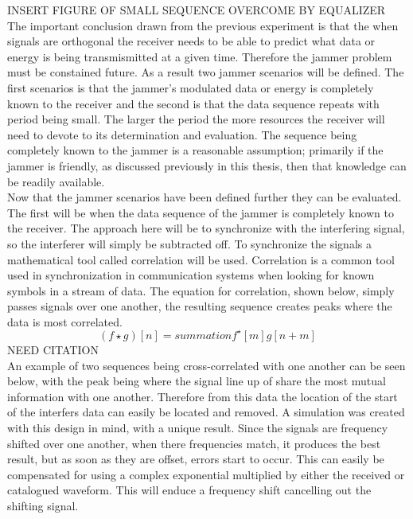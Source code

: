 INSERT FIGURE OF SMALL SEQUENCE OVERCOME BY EQUALIZER\\

The important conclusion drawn from the previous experiment is that the when signals are orthogonal the receiver needs to be able to predict what data or energy is being transmismitted at a given time.  Therefore the jammer problem must be constained future.  As a result two jammer scenarios will be defined.  The first scenarios is that the jammer's modulated data or energy is completely known to the receiver and the second is that the data sequence repeats with period being small.  The larger the period the more resources the receiver will need to devote to its determination and evaluation.  The sequence being completely known to the jammer is a reasonable assumption; primarily if the jammer is friendly, as discussed previously in this thesis, then that knowledge can be readily available.\\

Now that the jammer scenarios have been defined further they can be evaluated.  The first will be when the data sequence of the jammer is completely known to the receiver.  The approach here will be to synchronize with the interfering signal, so the interferer will simply be subtracted off.  To synchronize the signals a mathematical tool called correlation will be used.  Correlation is a common tool used in synchronization in communication systems when looking for known symbols in a stream of data.  The equation for correlation, shown below, simply passes signals over one another, the resulting sequence creates peaks where the data is most correlated.\\

\[ (f\star g)[n] = summation f^{\star}[m]g[n+m]\] NEED CITATION\\

An example of two sequences being cross-correlated with one another can be seen below, with the peak being where the signal line up of share the most mutual information with one another.  Therefore from this data the location of the start of the interfers data can easily be located and removed.  A simulation was created with this design in mind, with a unique result.  Since the signals are frequency shifted over one another, when there frequencies match, it produces the best result, but as soon as they are offset, errors start to occur.  This can easily be compensated for using a complex exponential multiplied by either the received or catalogued waveform.  This will enduce a frequency shift cancelling out the shifting signal.\\


